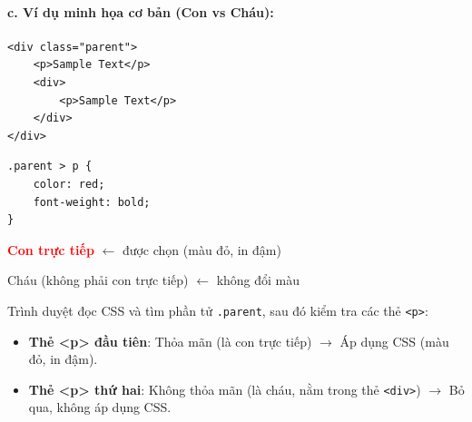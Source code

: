 \documentclass[11pt,oneside]{book}
\newcommand{\codeinline}[1]{\textcolor{accentOrange}{\texttt{#1}}}
\begin{document}
\paragraph{c. Ví dụ minh họa cơ bản (Con vs Cháu):}
\begin{codeWindow}
\begin{lstlisting}[language=HTML5]
<div class="parent">
    <p>Sample Text</p>
    <div>
        <p>Sample Text</p>
    </div>
</div>
\end{lstlisting}

\begin{lstlisting}[language=CSS3]
.parent > p {
    color: red;
    font-weight: bold;
}
\end{lstlisting}
\end{codeWindow}

\begin{browserWindow}
\sffamily\small
\begin{tcolorbox}[arc=2pt, colback=primaryBlue!5, colframe=primaryBlue!40, boxrule=1pt, title={\sffamily\small\color{white}\textbf{.parent}}, colbacktitle=primaryBlue!70]
\textcolor{red}{\textbf{Con trực tiếp}} {\small\textcolor{gray!60}{$\leftarrow$ được chọn (màu đỏ, in đậm)}} \par\vspace{3pt}
\begin{tcolorbox}[arc=2pt, colback=white, colframe=gray!30, boxrule=1pt, title={\sffamily\scriptsize\color{darkText}div lồng bên trong}]
\textcolor{darkText}{Cháu (không phải con trực tiếp)} {\small\textcolor{gray!60}{$\leftarrow$ không đổi màu}}
\end{tcolorbox}
\end{tcolorbox}
\end{browserWindow}

\begin{noteBox}
Trình duyệt đọc CSS và tìm phần tử \codeinline{.parent}, sau đó kiểm tra các thẻ \codeinline{<p>}:
\begin{itemize}[leftmargin=1.5em, itemsep=2pt, parsep=0pt]
    \item \textcolor{tipBorder}{\textbf{Thẻ <p> đầu tiên}}: Thỏa mãn (là con trực tiếp) $\rightarrow$ Áp dụng CSS (màu đỏ, in đậm).
    \item \textcolor{warnBorder}{\textbf{Thẻ <p> thứ hai}}: Không thỏa mãn (là cháu, nằm trong thẻ \codeinline{<div>}) $\rightarrow$ Bỏ qua, không áp dụng CSS.
\end{itemize}
\end{noteBox}
\end{document}
